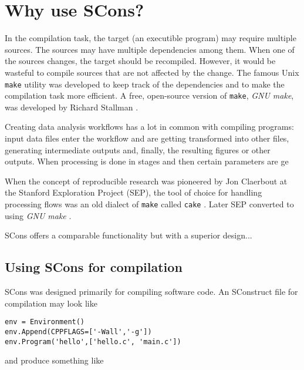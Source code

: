 \section{Why use SCons?}

In the compilation task, the target (an executible program) may
require multiple sources. The sources may have multiple dependencies
among them. When one of the sources changes, the target should be
recompiled. However, it would be wasteful to compile sources that are
not affected by the change. The famous Unix \texttt{make} utility was
developed to keep track of the dependencies and to make the
compilation task more efficient. A free, open-source version of
\texttt{make}, \emph{GNU make}, was developed by Richard Stallman
\cite[]{make}.

Creating data analysis workflows has a lot in common with compiling
programs: input data files enter the workflow and are getting
transformed into other files, generating intermediate outputs and,
finally, the resulting figures or other outputs. When processing is
done in stages and then certain parameters are ge

When the concept of reproducible research was pioneered by Jon
Claerbout at the Stanford Exploration Project (SEP), the tool of
choice for handling processing flows was an old dialect of
\texttt{make} called \texttt{cake}
\cite[]{Nichols.sep.61.341,Claerbout.sep.67.145,Claerbout.sep.73.451,Claerbout.sep.77.427}. Later
SEP converted to using \emph{GNU make} \cite{Schwab.sep.89.217}.

SCons offers a comparable functionality but with a superior design...

\subsection{Using SCons for compilation}

SCons was designed primarily for compiling software code. An SConstruct file for compilation may look like


\begin{lstlisting}
env = Environment()
env.Append(CPPFLAGS=['-Wall','-g'])
env.Program('hello',['hello.c', 'main.c'])
\end{lstlisting}

and produce something like

